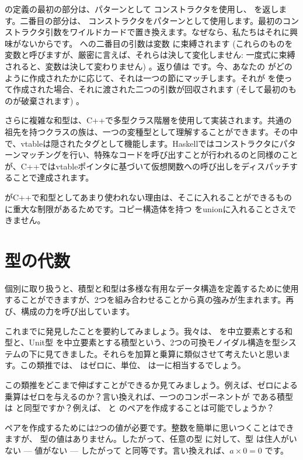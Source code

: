  の定義の最初の部分は、パターンとして  コンストラクタを使用し、 を返します。二番目の部分は、 コンストラクタをパターンとして使用します。最初のコンストラクタ引数をワイルドカードで置き換えます。なぜなら、私たちはそれに興味がないからです。  への二番目の引数は変数  に束縛されます (これらのものを変数と呼びますが、厳密に言えば、それらは決して変化しません: 一度式に束縛されると、変数は決して変わりません) 。返り値は  です。今、あなたの  がどのように作成されたかに応じて、それは一つの節にマッチします。それが  を使って作成された場合、それに渡された二つの引数が回収されます (そして最初のものが破棄されます) 。

さらに複雑な和型は、C++で多型クラス階層を使用して実装されます。共通の祖先を持つクラスの族は、一つの変種型として理解することができます。その中で、vtableは隠されたタグとして機能します。Haskellではコンストラクタにパターンマッチングを行い、特殊なコードを呼び出すことが行われるのと同様のことが、C++ではvtableポインタに基づいて仮想関数への呼び出しをディスパッチすることで達成されます。

 がC++で和型としてあまり使われない理由は、そこに入れることができるものに重大な制限があるためです。コピー構造体を持つ  をunionに入れることさえできません。

\section{型の代数}

個別に取り扱うと、積型と和型は多様な有用なデータ構造を定義するために使用することができますが、2つを組み合わせることから真の強みが生まれます。再び、構成の力を呼び出しています。

これまでに発見したことを要約してみましょう。我々は、 を中立要素とする和型と、Unit型 \code{()} を中立要素とする積型という、2つの可換モノイダル構造を型システムの下に見てきました。それらを加算と乗算に類似させて考えたいと思います。この類推では、 はゼロに、単位、\code{()} は一に相当するでしょう。

この類推をどこまで伸ばすことができるか見てみましょう。例えば、ゼロによる乗算はゼロを与えるのか？言い換えれば、一つのコンポーネントが  である積型は  と同型ですか？例えば、 と  のペアを作成することは可能でしょうか？

ペアを作成するためには2つの値が必要です。整数を簡単に思いつくことはできますが、  型の値はありません。したがって、任意の型  に対して、型  は住人がいない --- 値がない --- したがって  と同等です。言い換えれば、$a \times 0 = 0$ です。

